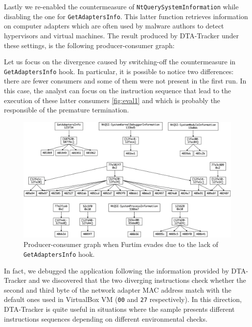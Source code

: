 \documentclass[LaM,binding=0.6cm]{sapthesis}
\begin{document}
Lastly we re-enabled the countermeasure of \texttt{NtQuerySystemInformation} while disabling the one for \texttt{GetAdaptersInfo}. This latter function retrieves information on computer adapters which are often used by malware authors to detect hypervisors and virtual machines. The result produced by {\sf DTA-Tracker} under these settings, is the following producer-consumer graph:

Let us focus on the divergence caused by switching-off the countermeasure in \texttt{GetAdaptersInfo} hook. In particular, it is possible to notice two differences: there are fewer consumers and some of them were not present in the first run. In this case, the analyst can focus on the instruction sequence that lead to the execution of these latter consumers \autoref{fig:eval1} and which is probably the responsible of the premature termination.

\clearpage
\begin{figure}[h!]
\centering%
\includegraphics[width=\textwidth]{images/eval3_def}
\caption{Producer-consumer graph when Furtim evades due to the lack of \texttt{GetAdaptersInfo} hook.}
\label{fig:eval3}
\end{figure}

\noindent
In fact, we debugged the application following the information provided by {\sf DTA-Tracker} and we discovered that the two diverging instructions check whether the second and third byte of the network adapter MAC address match with the default ones used in VirtualBox VM (\texttt{00} and \texttt{27} respectively). In this direction, {\sf DTA-Tracker} is quite useful in situations where the sample presents different instructions sequences depending on different environmental checks.
\end{document}
